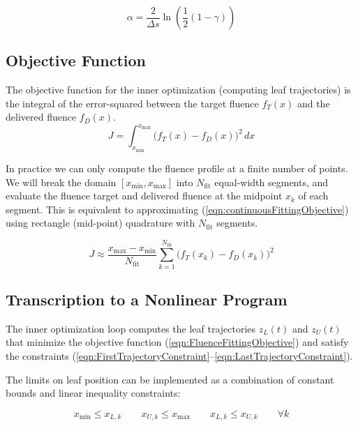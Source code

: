 \begin{equation}
  \alpha = \frac{2}{\Delta s} \ln \left( \frac{1}{2} (1 - \gamma) \right)
\end{equation}


\subsection{Objective Function}

The objective function for the inner optimization (computing leaf trajectories)
is the integral of the error-squared between the target fluence $f_T(x)$ and the delivered fluence $f_D(x)$.
\begin{equation}
  J = \int_{x_\text{min}}^{x_\text{max}} \! \big( f_T(x) - f_D(x) \big)^2 \,dx
  \label{eqn:continuousFittingObjective}
\end{equation}

In practice we can only compute the fluence profile at a finite number of points.
We will break the domain $[x_\text{min}, x_\text{max}]$ into $N_\text{fit}$ equal-width segments,
and evaluate the fluence target and delivered fluence at the midpoint $x_k$ of each segment.
This is equivalent to approximating (\ref{eqn:continuousFittingObjective}) using rectangle (mid-point)
quadrature with $N_\text{fit}$ segments.

\begin{equation}
  J \approx \frac{x_\text{max} - x_\text{min}}{N_\text{fit}}\sum_{k = 1}^{N_\text{fit}} \! \big( f_T(x_k) - f_D(x_k) \big)^2
  \label{eqn:discreteFittingObjective}
\end{equation}

\subsection{Transcription to a Nonlinear Program}

The inner optimization loop computes the leaf trajectories $z_L(t)$ and $z_U(t)$
that minimize the objective function (\ref{eqn:FluenceFittingObjective})
and satisfy the constraints (\ref{eqn:FirstTrajectoryConstraint}--\ref{eqn:LastTrajectoryConstraint}).

The limits on leaf position can be implemented as a combination of
constant bounds and linear inequality constraints:

\begin{equation}
  x_\text{min} \leq x_{L, k}
  \quad \quad
  x_{U, k} \leq x_\text{max}
  \quad \quad
  x_{L, k} \leq x_{U, k}
  \quad \quad
  \forall k
\end{equation}

